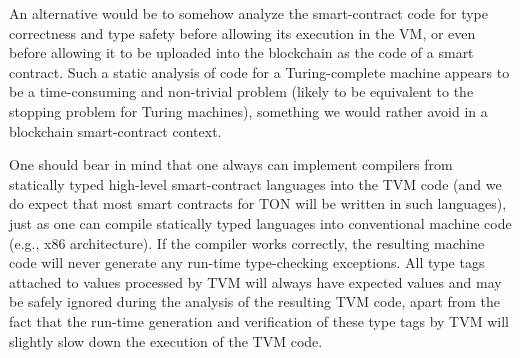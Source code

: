 \documentclass[12pt,oneside]{article}
\begin{document}
An alternative would be to somehow analyze the smart-contract code for type correctness and type safety before allowing its execution in the VM, or even before allowing it to be uploaded into the blockchain as the code of a smart contract. Such a static analysis of code for a Turing-complete machine appears to be a time-consuming and non-trivial problem (likely to be equivalent to the stopping problem for Turing machines), something we would rather avoid in a blockchain smart-contract context.

One should bear in mind that one always can implement compilers from statically typed high-level smart-contract languages into the TVM code (and we do expect that most smart contracts for TON will be written in such languages), just as one can compile statically typed languages into conventional machine code (e.g., x86 architecture). If the compiler works correctly, the resulting machine code will never generate any run-time type-checking exceptions. All type tags attached to values processed by TVM will always have expected values and may be safely ignored during the analysis of the resulting TVM code, apart from the fact that the run-time generation and verification of these type tags by TVM will slightly slow down the execution of the TVM code.
\end{document}
